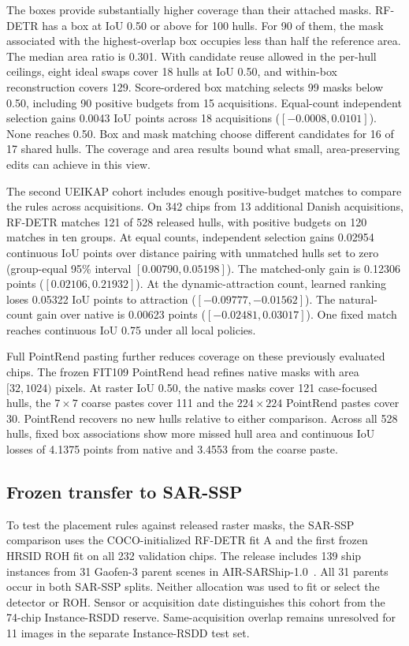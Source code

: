 \documentclass[journal]{IEEEtran}
\begin{document}
The boxes provide substantially higher coverage than their attached masks. RF-DETR has a box at IoU 0.50 or above for 100 hulls. For 90 of them, the mask associated with the highest-overlap box occupies less than half the reference area. The median area ratio is 0.301. With candidate reuse allowed in the per-hull ceilings, eight ideal swaps cover 18 hulls at IoU 0.50, and within-box reconstruction covers 129. Score-ordered box matching selects 99 masks below 0.50, including 90 positive budgets from 15 acquisitions. Equal-count independent selection gains 0.0043 IoU points across 18 acquisitions (\([-0.0008,0.0101]\)). None reaches 0.50. Box and mask matching choose different candidates for 16 of 17 shared hulls. The coverage and area results bound what small, area-preserving edits can achieve in this view.

The second UEIKAP cohort includes enough positive-budget matches to compare the rules across acquisitions. On 342 chips from 13 additional Danish acquisitions, RF-DETR matches 121 of 528 released hulls, with positive budgets on 120 matches in ten groups. At equal counts, independent selection gains 0.02954 continuous IoU points over distance pairing with unmatched hulls set to zero (group-equal 95\% interval \([0.00790,0.05198]\)). The matched-only gain is 0.12306 points (\([0.02106,0.21932]\)). At the dynamic-attraction count, learned ranking loses 0.05322 IoU points to attraction (\([-0.09777,-0.01562]\)). The natural-count gain over native is 0.00623 points (\([-0.02481,0.03017]\)). One fixed match reaches continuous IoU 0.75 under all local policies.

Full PointRend pasting further reduces coverage on these previously evaluated chips. The frozen FIT109 PointRend head refines native masks with area \([32,1024)\) pixels. At raster IoU 0.50, the native masks cover 121 case-focused hulls, the \(7{\times}7\) coarse pastes cover 111 and the \(224{\times}224\) PointRend pastes cover 30. PointRend recovers no new hulls relative to either comparison. Across all 528 hulls, fixed box associations show more missed hull area and continuous IoU losses of 4.1375 points from native and 3.4553 from the coarse paste.

\subsection{Frozen transfer to SAR-SSP}
\label{sec:sar-ssp}
To test the placement rules against released raster masks, the SAR-SSP comparison uses the COCO-initialized RF-DETR fit A and the first frozen HRSID ROH fit on all 232 validation chips. The release includes 139 ship instances from 31 Gaofen-3 parent scenes in AIR-SARShip-1.0~\cite{slgsea,airsarship}. All 31 parents occur in both SAR-SSP splits. Neither allocation was used to fit or select the detector or ROH. Sensor or acquisition date distinguishes this cohort from the 74-chip Instance-RSDD reserve. Same-acquisition overlap remains unresolved for 11 images in the separate Instance-RSDD test set.
\end{document}
